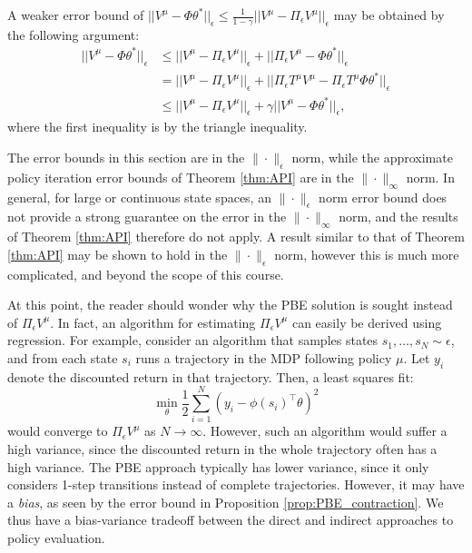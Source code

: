 \begin{remark}
A weaker error bound of $||V^\mu - \Phi \theta^*||_\epsilon \le \frac{1}{1-\gamma}||V^\mu-\Pi_\epsilon
V^\mu||_\epsilon$ may be obtained by the following argument:
\begin{equation}
\begin{split}
  ||V^\mu - \Phi \theta^*||_\epsilon  &\leq ||V^\mu
-\Pi_\epsilon V^\mu||_\epsilon + ||\Pi_\epsilon V^\mu -\Phi \theta^*||_\epsilon  \\
    &= ||V^\mu -\Pi_\epsilon V^\mu||_\epsilon + ||\Pi_\epsilon T^\mu V^\mu -\Pi_\epsilon T^\mu\Phi \theta^*||_\epsilon \\
&\leq ||V^\mu -\Pi_\epsilon V^\mu||_\epsilon + \gamma||V^\mu-\Phi \theta^*||_\epsilon,
\end{split}
\end{equation}
where the first inequality is by the triangle inequality.
\end{remark}
\begin{remark}
The error bounds in this section are in the $\| \cdot \|_\epsilon$ norm, while the approximate policy iteration error bounds of Theorem \ref{thm:API} are in the $\| \cdot \|_\infty$ norm. In general, for large or continuous state spaces, an $\| \cdot \|_\epsilon$ norm error bound does not provide a strong guarantee on the error in the $\| \cdot \|_\infty$ norm, and the results of Theorem \ref{thm:API} therefore do not apply. A result similar to that of Theorem \ref{thm:API} may be shown to hold in the $\| \cdot \|_\epsilon$ norm, however this is much more complicated, and beyond the scope of this course.
\end{remark}
\begin{remark}
At this point, the reader should wonder why the PBE solution is sought instead of $\Pi_\epsilon V^\mu$. In fact, an algorithm for estimating $\Pi_\epsilon V^\mu$ can easily be derived using regression. For example, consider an algorithm that samples states $s_1,\dots,s_N \sim \epsilon$, and from each state $s_i$ runs a trajectory in the MDP following policy $\mu$. Let $y_i$ denote the discounted return in that trajectory. Then, a least squares fit:
\begin{equation*}
    \min_\theta \frac{1}{2}\sum_{i=1}^{N} \left(y_i - \phi(s_i)^\top\theta\right)^2
\end{equation*}
would converge to $\Pi_\epsilon V^\mu$ as $N\to \infty$. However, such an algorithm would suffer a high variance, since the discounted return in the whole trajectory often has a high variance. The PBE approach typically has lower variance, since it only considers 1-step transitions instead of complete trajectories. However, it may have a \emph{bias}, as seen by the error bound in Proposition \ref{prop:PBE_contraction}. We thus have a bias-variance tradeoff between the direct and indirect approaches to policy evaluation.
\end{remark}
